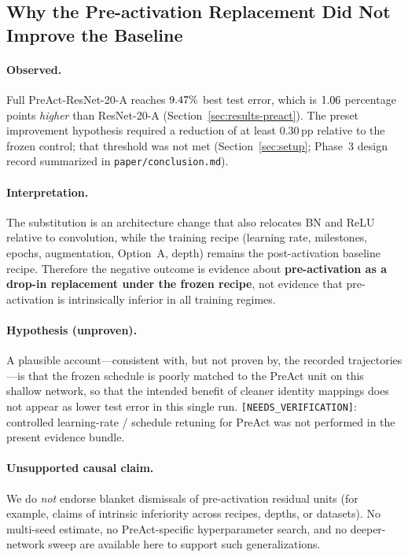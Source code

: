 \subsection{Why the Pre-activation Replacement Did Not Improve the Baseline}
\label{sec:disc-preact}

\paragraph{Observed.}
Full PreAct-ResNet-20-A reaches $9.47\%$ best test error, which is
$1.06$ percentage points \emph{higher} than ResNet-20-A
(Section~\ref{sec:results-preact}).
The preset improvement hypothesis required a reduction of at least $0.30$\,pp
relative to the frozen control; that threshold was not met
(Section~\ref{sec:setup}; Phase~3 design record summarized in \texttt{paper/conclusion.md}).

\paragraph{Interpretation.}
The substitution is an architecture change that also relocates BN and ReLU relative to
convolution, while the training recipe (learning rate, milestones, epochs, augmentation,
Option~A, depth) remains the post-activation baseline recipe.
Therefore the negative outcome is evidence about
\textbf{pre-activation as a drop-in replacement under the frozen recipe},
not evidence that pre-activation is intrinsically inferior in all training regimes.

\paragraph{Hypothesis (unproven).}
A plausible account---consistent with, but not proven by, the recorded trajectories---is
that the frozen schedule is poorly matched to the PreAct unit on this shallow network,
so that the intended benefit of cleaner identity mappings does not appear as lower test error
in this single run.
\texttt{[NEEDS\_VERIFICATION]}: controlled learning-rate / schedule retuning for PreAct
was not performed in the present evidence bundle.

\paragraph{Unsupported causal claim.}
We do \emph{not} endorse blanket dismissals of pre-activation residual units
(for example, claims of intrinsic inferiority across recipes, depths, or datasets).
No multi-seed estimate, no PreAct-specific hyperparameter search, and no deeper-network
sweep are available here to support such generalizations.

